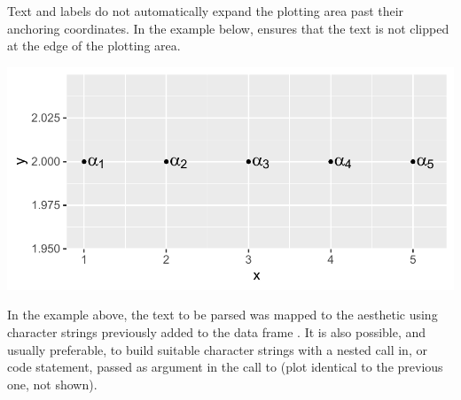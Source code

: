 \documentclass[krantz2]{krantz}\usepackage{knitr}
\begin{document}
Text and labels do not automatically expand the plotting area past their anchoring coordinates. In the example below,  ensures that the text is not clipped at the edge of the plotting area.

\begin{knitrout}\footnotesize
{}\color{fgcolor}\begin{kframe}
\begin{alltt}
\hlstd{(} 
        \hlstd{=}    \hlopt{+}
  \hlstd{(} \hlstd{=} \hlopt{-}\hlstd{,}  \hlstd{=} \hlstd{,}  \hlstd{=} \hlstd{)} \hlopt{+}
  \hlstd{()} \hlopt{+}
  \hlstd{(} \hlstd{=} \hlstd{)}
\end{alltt}
\end{kframe}

{\centering \includegraphics[width=.7\textwidth]{figure/pos-text-plot-06-1} 

}


\end{knitrout}

In the example above, the text to be parsed was mapped to the  aesthetic using character strings previously added to the data frame . It is also possible, and usually preferable, to build suitable character strings with a nested call in, or code statement, passed as argument in the call to  (plot identical to the previous one, not shown).

\begin{knitrout}\footnotesize
{}\color{fgcolor}\begin{kframe}
\begin{alltt}
\hlstd{(} 
        \hlstd{=}   \hlstd{=} \hlstd{(}\hlstr{"alpha["} \hlstr{"]"}\hlstd{,}  \hlstd{=} \hlstd{)))} \hlopt{+}
  \hlstd{(} \hlstd{=} \hlopt{-}\hlstd{,}  \hlstd{=} \hlstd{,}  \hlstd{=} \hlstd{)} \hlopt{+}
  \hlstd{()}
\end{alltt}
\end{kframe}
\end{knitrout}
\end{document}
